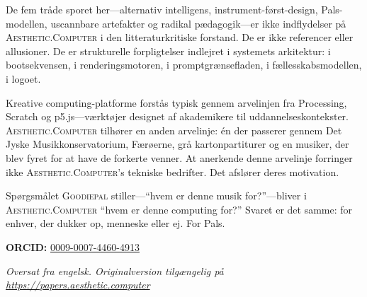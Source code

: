 \documentclass[10pt,letterpaper,twocolumn]{article}
\newcommand{\ac}{\textsc{Aesthetic.Computer}}
\newcommand{\gp}{\textsc{Goodiepal}}
\begin{document}
De fem tråde sporet her---alternativ intelligens, instrument-først-design, Pals-modellen, uscannbare artefakter og radikal pædagogik---er ikke indflydelser på \ac{} i den litteraturkritiske forstand. De er ikke referencer eller allusioner. De er strukturelle forpligtelser indlejret i systemets arkitektur: i bootsekvensen, i renderingsmotoren, i promptgrænsefladen, i fællesskabsmodellen, i logoet.

Kreative computing-platforme forstås typisk gennem arvelinjen fra Processing, Scratch og p5.js---værktøjer designet af akademikere til uddannelseskontekster. \ac{} tilhører en anden arvelinje: én der passerer gennem Det Jyske Musikkonservatorium, Færøerne, grå kartonpartiturer og en musiker, der blev fyret for at have de forkerte venner. At anerkende denne arvelinje forringer ikke \ac{}'s tekniske bedrifter. Det afslører deres motivation.

Spørgsmålet \gp{} stiller---``hvem er denne musik for?''---bliver i \ac{} ``hvem er denne computing for?'' Svaret er det samme: for enhver, der dukker op, menneske eller ej. For Pals.

\vspace{0.5em}
\noindent\textbf{ORCID:} \href{https://orcid.org/0009-0007-4460-4913}{0009-0007-4460-4913}

\vspace{0.5em}
\noindent\textit{Oversat fra engelsk. Originalversion tilgængelig på \url{https://papers.aesthetic.computer}}



\end{document}
